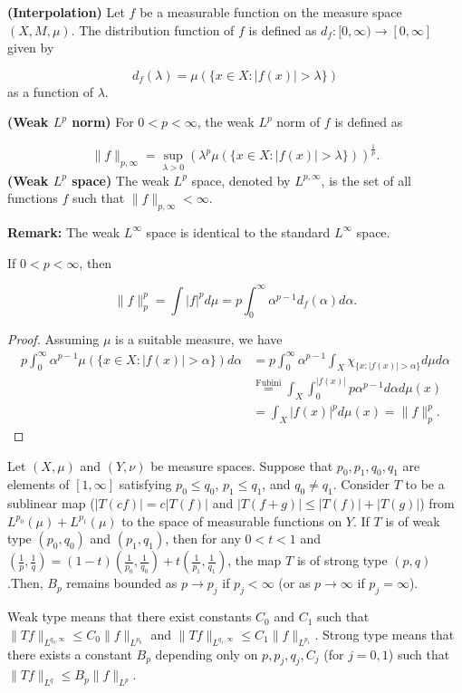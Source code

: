 \noindent\textbf{(Interpolation)} Let $f$ be a measurable function on the measure space $(X, M, \mu)$. The distribution function of $f$ is defined as $d_f: [0, \infty) \rightarrow [0, \infty]$ given by

$$d_f(\lambda) = \mu(\{x \in X: |f(x)| > \lambda\})$$as a function of $\lambda$.

\noindent\textbf{(Weak $L^p$ norm)} For $0 < p < \infty$, the weak $L^p$ norm of $f$ is defined as

$$\|f\|_{p, \infty} = \sup_{\lambda > 0} \left(\lambda^p \mu(\{x \in X: |f(x)| > \lambda\})\right)^{\frac{1}{p}}.
$$
\noindent\textbf{(Weak $L^p$ space)} The weak $L^p$ space, denoted by $L^{p, \infty}$, is the set of all functions $f$ such that $\|f\|_{p, \infty} < \infty$.

\noindent\textbf{Remark:} The weak $L^{\infty}$ space is identical to the standard $L^{\infty}$ space.

\begin{proposition}
    If $0 < p < \infty$, then

$$\|f\|_p^p = \int |f|^p d\mu = p \int_0^{\infty} \alpha^{p-1} d_f(\alpha) d\alpha.$$
\end{proposition} 
\begin{proof}
    Assuming $\mu$ is a suitable measure, we have
$$
\begin{aligned}
p \int_0^{\infty} \alpha^{p-1} \mu(\{x \in X: |f(x)| > \alpha\}) d\alpha &= p \int_0^{\infty} \alpha^{p-1} \int_X \chi_{\{x: |f(x)| > \alpha\}} d\mu d\alpha \\
&\stackrel{\text{Fubini}}{=} \int_X \int_0^{|f(x)|} p \alpha^{p-1} d\alpha d\mu(x) \\
&= \int_X |f(x)|^p d\mu(x) = \|f\|_p^p.
\end{aligned}
$$
\end{proof}
\begin{theorem}
    Let $(X, \mu)$ and $(Y, \nu)$ be measure spaces. Suppose that $p_0, p_1, q_0, q_1$ are elements of $[1, \infty]$ satisfying $p_0 \leqslant q_0$, $p_1 \leqslant q_1$, and $q_0 \neq q_1$. Consider $T$ to be a sublinear map ($|T(cf)| = c|T(f)|$ and $|T(f+g)| \leqslant |T(f)| + |T(g)|$) from $L^{p_0}(\mu) + L^{p_1}(\mu)$ to the space of measurable functions on $Y$. If $T$ is of weak type $(p_0, q_0)$ and $(p_1, q_1)$, then for any $0 < t < 1$ and $\left(\frac{1}{p}, \frac{1}{q}\right) = (1-t)\left(\frac{1}{p_0}, \frac{1}{q_0}\right) + t\left(\frac{1}{p_1}, \frac{1}{q_1}\right)$, the map $T$ is of strong type $(p, q)$.Then, $B_p$ remains bounded as $p \rightarrow p_j$ if $p_j < \infty$ (or as $p \rightarrow \infty$ if $p_j = \infty$).
\end{theorem}
\begin{rmk}
  Weak type means that there exist constants $C_0$ and $C_1$ such that $\|Tf\|_{L^{q_0, \infty}} \leqslant C_0\|f\|_{L^{p_0}}$ and $\|Tf\|_{L^{q_1, \infty}} \leqslant C_1\|f\|_{L^{p_1}}$.
Strong type means that there exists a constant $B_p$ depending only on $p, p_j, q_j, C_j$ (for $j = 0, 1$) such that $\|Tf\|_{L^q} \leqslant B_p\|f\|_{L^p}$.   
\end{rmk}

